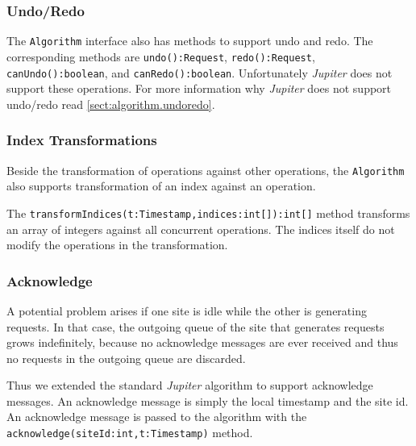 \subsubsection{Undo/Redo}
The \texttt{Algorithm} interface also has methods to support undo and redo.
The corresponding methods are \texttt{undo():Request}, \texttt{redo():Request},
\texttt{canUndo():boolean}, and \texttt{canRedo():boolean}. Unfortunately
\emph{Jupiter} does not support these operations. For more information why
\emph{Jupiter} does not support undo/redo read \ref{sect:algorithm.undoredo}.

\subsubsection{Index Transformations}
Beside the transformation of operations against other operations, the
\texttt{Algorithm} also supports transformation of an index against an
operation. 

The \texttt{transformIndices(t:Timestamp,indices:int[]):int[]} method transforms
an array of integers against all concurrent operations. The indices itself
do not modify the operations in the transformation.

\subsubsection{Acknowledge}
A potential problem arises if one site is idle while the other is generating
requests. In that case, the outgoing queue of the site that generates requests
grows indefinitely, because no acknowledge messages are ever received and thus
no requests in the outgoing queue are discarded.

Thus we extended the standard \emph{Jupiter} algorithm to support acknowledge
messages. An acknowledge message is simply the local timestamp and the site
id. An acknowledge message is passed to the algorithm with the
\texttt{acknowledge(siteId:int,t:Timestamp)} method.



